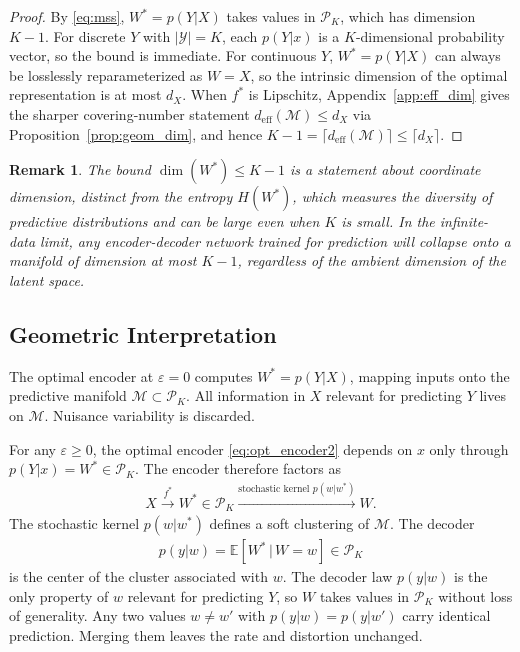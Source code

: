 \documentclass[11pt]{article}
\newtheorem{remark}{Remark}
\begin{document}
\begin{proof}
By \eqref{eq:mss}, $W^*=p(Y|X)$ takes values in $\mathcal{P}_K$, which has dimension $K-1$.
For discrete $Y$ with $|\mathcal{Y}|=K$, each $p(Y|x)$ is a
$K$-dimensional probability vector, so the bound is immediate.
For continuous $Y$, $W^*=p(Y|X)$ can always be losslessly
reparameterized as $W=X$, so the intrinsic dimension of the optimal
representation is at most $d_X$.
When $f^*$ is Lipschitz, Appendix~\ref{app:eff_dim} gives the sharper
covering-number statement $d_{\mathrm{eff}}(\mathcal{M})\leq d_X$ via
Proposition~\ref{prop:geom_dim}, and hence
$K-1=\lceil d_{\mathrm{eff}}(\mathcal{M})\rceil\leq\lceil d_X\rceil$.
\end{proof}

\begin{remark}
The bound $\dim(W^*)\leq K-1$ is a statement about coordinate
dimension, distinct from the entropy $H(W^*)$, which measures the
diversity of predictive distributions and can be large even when $K$
is small.
In the infinite-data limit, any encoder-decoder network trained for
prediction will collapse onto a manifold of dimension at most $K-1$,
regardless of the ambient dimension of the latent space.
\end{remark}

\subsection{Geometric Interpretation}
\label{sec:geometric}

The optimal encoder at $\varepsilon=0$ computes $W^*=p(Y|X)$, mapping
inputs onto the predictive manifold
$\mathcal{M}\subset\mathcal{P}_K$.
All information in $X$ relevant for predicting $Y$ lives on $\mathcal{M}$.
Nuisance variability is discarded.

For any $\varepsilon\geq 0$, the optimal encoder \eqref{eq:opt_encoder2}
depends on $x$ only through $p(Y|x)=W^*\in\mathcal{P}_K$.
The encoder therefore factors as
\begin{align}
    X \xrightarrow{f^*} W^* \in \mathcal{P}_K
    \xrightarrow{\text{stochastic kernel } p(w|w^*)} W.
\end{align}
The stochastic kernel $p(w|w^*)$ defines a soft clustering of $\mathcal{M}$.
The decoder
\begin{align}
    p(y|w) = \mathbb{E}[W^*\,|\,W=w] \in \mathcal{P}_K
    \label{eq:decoder_center}
\end{align}
is the center of the cluster associated with $w$.
The decoder law $p(y|w)$ is the only property of $w$ relevant for
predicting $Y$, so $W$ takes values in $\mathcal{P}_K$ without loss
of generality.
Any two values $w\neq w'$ with $p(y|w)=p(y|w')$ carry identical
prediction. Merging them leaves the rate and distortion unchanged.
\end{document}
